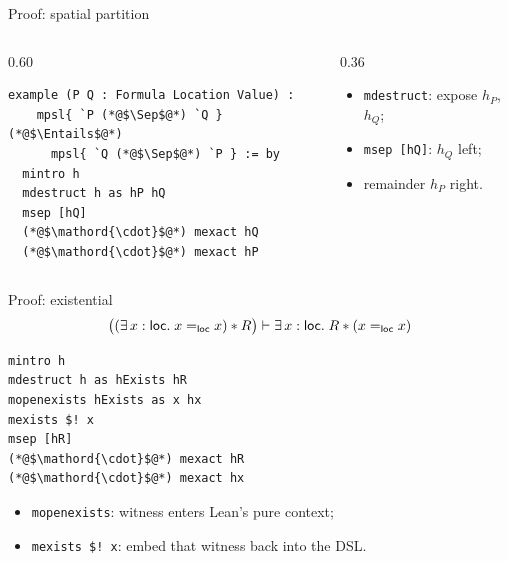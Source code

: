\documentclass[10pt,aspectratio=169]{beamer}
\begin{document}
\begin{frame}[fragile]{Proof: spatial partition}
  \begin{columns}[T,onlytextwidth]
    \begin{column}{0.60\textwidth}
\begin{lstlisting}[style=leancode]
example (P Q : Formula Location Value) :
    mpsl{ `P (*@$\Sep$@*) `Q } (*@$\Entails$@*)
      mpsl{ `Q (*@$\Sep$@*) `P } := by
  mintro h
  mdestruct h as hP hQ
  msep [hQ]
  (*@$\mathord{\cdot}$@*) mexact hQ
  (*@$\mathord{\cdot}$@*) mexact hP
\end{lstlisting}
    \end{column}
    \begin{column}{0.36\textwidth}
      \begin{itemize}
        \item \texttt{mdestruct}: expose $h_P$, $h_Q$;
        \item \texttt{msep [hQ]}: $h_Q$ left;
        \item remainder $h_P$ right.
      \end{itemize}
    \end{column}
  \end{columns}

  \vfill
\end{frame}

\begin{frame}[fragile]{Proof: existential}
  \[
    \bigl((\exists\,x : \mathsf{loc}.\;x=_{\mathsf{loc}}x)\mathbin{*} R\bigr)
    \mathrel{\vdash}
    \exists\,x : \mathsf{loc}.\;R\mathbin{*}(x=_{\mathsf{loc}}x)
  \]

\begin{lstlisting}[style=leancode]
mintro h
mdestruct h as hExists hR
mopenexists hExists as x hx
mexists $! x
msep [hR]
(*@$\mathord{\cdot}$@*) mexact hR
(*@$\mathord{\cdot}$@*) mexact hx
\end{lstlisting}

  \begin{itemize}
    \item \texttt{mopenexists}: witness enters Lean's pure context;
    \item \texttt{mexists \$! x}: embed that witness back into the DSL.
  \end{itemize}
\end{frame}
\end{document}
